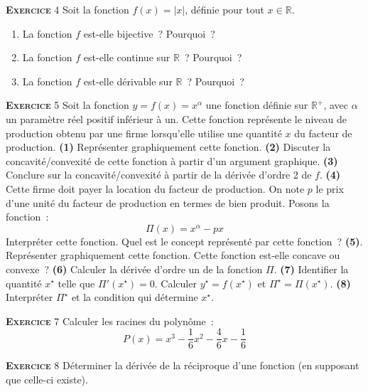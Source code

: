 \documentclass[10pt,a4paper,notitlepage]{article}
\newcommand{\exercice}[1]{\textsc{\textbf{Exercice}} #1}
\begin{document}
\pagebreak

\exercice{4} Soit la fonction $f(x) = |x|$, définie pour tout
$x\in\mathbb R$.
\begin{enumerate}
\item La fonction $f$ est-elle bijective ? Pourquoi ?
\item La fonction $f$ est-elle continue sur $\mathbb R$ ? Pourquoi ?
\item La fonction $f$ est-elle dérivable sur $\mathbb R$ ? Pourquoi ?
\end{enumerate}
 
\bigskip

\exercice{5} Soit la fonction $y = f(x) = x^{\alpha}$ une fonction définie
sur $\mathbb R^+$, avec $\alpha$ un paramètre réel positif inférieur à
un. Cette fonction représente le niveau de production
obtenu par une firme lorsqu'elle utilise une quantité $x$ du facteur
de production. \textbf{(1)} Représenter graphiquement cette
fonction. \textbf{(2)} Discuter la concavité/convexité de cette
fonction à partir d'un argument graphique. \textbf{(3)} Conclure sur
la concavité/convexité à partir de la dérivée d'ordre 2 de
$f$. \textbf{(4)} Cette firme doit payer la location du facteur de
production. On note $p$ le prix d'une unité du facteur de
production en termes de bien produit. Posons la fonction :
\[
\Pi(x) = x^{\alpha} - p x
\]
Interpréter cette fonction. Quel est le concept représenté par cette
fonction ? \textbf{(5)}. Représenter graphiquement cette fonction. Cette fonction est-elle concave ou convexe ?
\textbf{(6)} Calculer la dérivée d'ordre un de la fonction
$\Pi$. \textbf{(7)} Identifier la quantité $x^{\star}$ telle que
$\Pi'(x^{\star}) = 0$. Calculer $y^{\star}=f(x^{\star})$ et
$\Pi^{\star} = \Pi(x^{\star})$. \textbf{(8)} Interpréter $\Pi^{\star}$
et la condition qui détermine $x^{\star}$.

\bigskip

\exercice{7} Calculer les racines du polynôme :
\[
P(x) = x^3 - \frac{1}{6}x^2 - \frac{4}{6}x - \frac{1}{6}
\]    

\bigskip

\exercice{8} Déterminer la dérivée de la réciproque d'une fonction (en supposant que celle-ci existe).

\bigskip
\end{document}
